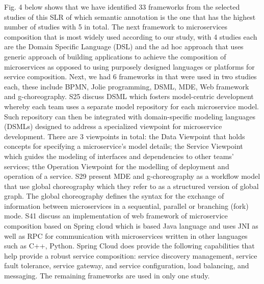\documentclass{article}
\begin{document}
\begin{multicols}{2}
Fig. 4 below shows that we have identified 33 frameworks from the selected studies of this SLR of which semantic annotation is the one that has the highest number of studies with 5 in total. The next framework to microservices composition that is most widely used according to our study, with 4 studies each are the Domain Specific Language (DSL) and the ad hoc approach that uses generic approach of building applications to achieve the composition of microservices as opposed to using purposely designed languages or platforms for service composition. Next, we had 6 frameworks in that were used in two studies each, these include BPMN, Jolie programming, DSML, MDE, Web framework and g-choreography. S25 discuss DSML which fosters model-centric developnent whereby each team uses a separate model repository for each microservice model. Such repository can then be integrated with domain-specific modeling languages (DSMLs) designed to address  a specialized viewpoint for microservice development. There are 3 viewpoints in total: the Data Viewpoint that holds concepts for specifying a microservice’s model details; the Service Viewpoint which guides the modeling of interfaces and dependencies to other teams’ services; tthe Operation Viewpoint for the modelling of deployment and operation of a service.
S29 present MDE and g-choreography as a workflow model that use global choreography which they refer to as a structured version of global graph. The global choreography defines the syntax for the exchange of information between microservices in a sequential, parallel or branching (fork) mode. 
S41 discuss an implementation of web framework of microservice composition based on Spring cloud which is based Java language and uses 
JNI as well as RPC for communication with microservices written in other languages such as C++, Python. Spring Cloud does provide the following capabilities that help provide a robust service composition: service discovery management, service fault tolerance, service gateway, and service configuration, load balancing, and messaging. The remaining frameworks are used in only one study. 


\end{multicols}
\end{document}
